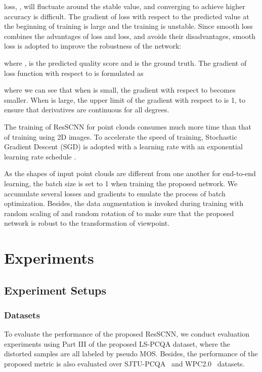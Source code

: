 \documentclass[acmsmall]{acmart}
\begin{document}
\par  loss, , will fluctuate around the stable value, and converging to achieve higher accuracy is difficult. The gradient of  loss  with respect to the predicted value at the beginning of training is large and the training is unstable. Since smooth  loss combines the advantages of  loss and  loss, and avoids their disadvantages, smooth  loss is adopted to improve the robustness of the network:

where ,  is the predicted quality score and  is the ground truth. The gradient of loss function with respect to  is formulated as

where we can see that when  is small, the gradient with respect to  becomes smaller. When  is large, the upper limit of the gradient with respect to  is 1, to ensure that derivatives are continuous for all degrees.

\par The training of ResSCNN for point clouds consumes much more time than that of training using 2D images. To accelerate the speed of training, Stochastic Gradient Descent (SGD) is adopted with a learning rate  with an exponential learning rate schedule .

\par As the shapes of input point clouds are different from one another for end-to-end learning, the batch size is set to 1 when training the proposed network. We accumulate several losses and gradients to emulate the process of batch optimization. Besides, the data augmentation is invoked during training with random scaling of  and random rotation of  to make sure that the proposed network is robust to the transformation of viewpoint.


\section{Experiments}\label{sec:experiment}

\subsection{Experiment Setups}

\subsubsection{Datasets}

\par To evaluate the performance of the proposed ResSCNN, we conduct evaluation experiments using Part III of the proposed LS-PCQA dataset, where the distorted samples are all labeled by pseudo MOS. Besides, the performance of the proposed metric is also evaluated over SJTU-PCQA~\cite{Yang2020TMM3DTO2D} and WPC2.0~\cite{Su2019WPC,Liu2022WPC} datasets.
\end{document}
